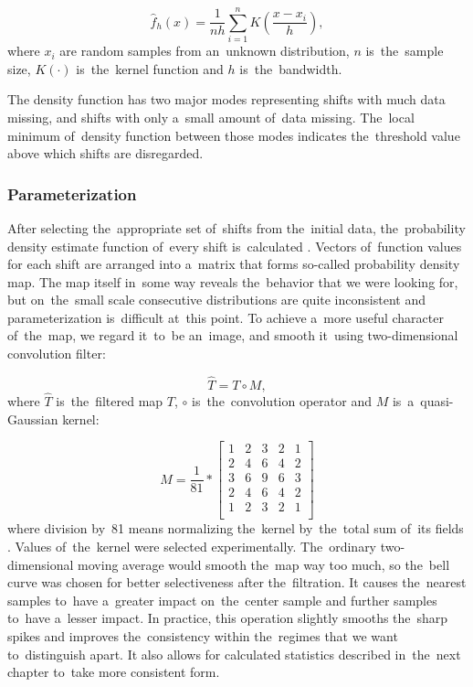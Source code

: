 \begin{equation}
  \hat{f}_h(x)=\frac{1}{nh}\sum_{i=1}^n K\left(\frac{x-x_i}{h}\right),
\end{equation}
where $x_i$ are random samples from an~unknown distribution, $n$ is~the~sample size, $K(\cdot)$ is~the~kernel function and $h$ is~the~bandwidth.


The density function has two major modes representing shifts with much data missing, and shifts with only a~small amount of~data missing. The~local minimum of~density function between those modes indicates the~threshold value above which shifts are disregarded. 

\subsubsection{Parameterization}\label{param}

After selecting the~appropriate set of~shifts from the~initial data, the~probability density estimate function of~every shift is~calculated \cite{bowman1997applied}. Vectors of~function values for each shift are arranged into a~matrix that forms so-called probability density map. The map itself in~some way reveals the~behavior that we were looking for, but on~the~small scale consecutive distributions are quite inconsistent and parameterization is~difficult at~this point. To achieve a~more useful character of~the~map, we regard it~to~be an~image, and smooth it~using two-dimensional convolution filter:

\begin{equation}
  \hat{T}=T\circ M,
\end{equation}
where $\hat{T}$ is~the~filtered map $T$, $\circ$ is~the~convolution operator and $M$ is~a~quasi-Gaussian kernel:

\begin{equation}
M=\frac{1}{81}*
\begin{bmatrix}
  1 & 2 & 3 & 2 & 1 \\
  2 & 4 & 6 & 4 & 2 \\
  3 & 6 & 9 & 6 & 3 \\
  2 & 4 & 6 & 4 & 2 \\
  1 & 2 & 3 & 2 & 1 \\
\end{bmatrix}
\end{equation}
where division by~81 means normalizing the~kernel by~the~total sum of~its fields \cite{arce2005nonlinear}. Values of~the~kernel were selected experimentally. The~ordinary two-dimensional moving average would smooth the~map way too much, so the~bell curve was chosen for better selectiveness after the~filtration. It causes the~nearest samples to~have a~greater impact on~the~center sample and further samples to~have a~lesser impact. In practice, this operation slightly smooths the~sharp spikes and improves the~consistency within the~regimes that we want to~distinguish apart. It also allows for calculated statistics described in~the~next chapter to~take more consistent form.

